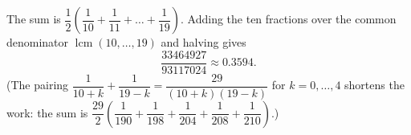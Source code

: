 The sum is $\dfrac{1}{2}\left(\dfrac{1}{10}+\dfrac{1}{11}+\dots+\dfrac{1}{19}\right)$. Adding the ten fractions over the common denominator $\operatorname{lcm}(10,\dots,19)$ and halving gives
\[
\boxed{\dfrac{33464927}{93117024}}\approx0.3594 .
\]
(The pairing $\dfrac{1}{10+k}+\dfrac{1}{19-k}=\dfrac{29}{(10+k)(19-k)}$ for $k=0,\dots,4$ shortens the work: the sum is $\dfrac{29}{2}\left(\dfrac{1}{190}+\dfrac{1}{198}+\dfrac{1}{204}+\dfrac{1}{208}+\dfrac{1}{210}\right)$.)
